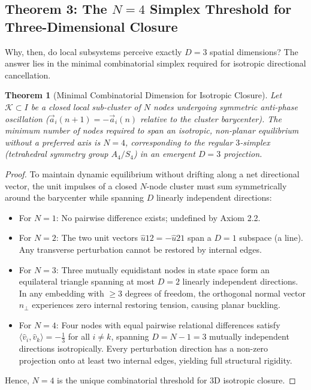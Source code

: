 \documentclass[11pt,a4paper]{article}
\theoremstyle{plain}
\newtheorem{theorem}{Theorem}[section]
\theoremstyle{definition}
\theoremstyle{remark}
\begin{document}
\subsection{Theorem 3: The $N=4$ Simplex Threshold for Three-Dimensional Closure}
Why, then, do local subsystems perceive exactly $D = 3$ spatial dimensions? The answer lies in the minimal combinatorial simplex required for isotropic directional cancellation.
\begin{theorem}[Minimal Combinatorial Dimension for Isotropic Closure]
\label{thm:simplex_3d}
Let $\mathcal{K} \subset I$ be a closed local sub-cluster of $N$ nodes undergoing symmetric anti-phase oscillation ($\vec{a}_i(n+1) = -\vec{a}_i(n)$ relative to the cluster barycenter). The minimum number of nodes required to span an isotropic, non-planar equilibrium without a preferred axis is $N = 4$, corresponding to the regular $3$-simplex (tetrahedral symmetry group $A_4 / S_4$) in an emergent $D = 3$ projection.
\end{theorem}
\begin{proof}
To maintain dynamic equilibrium without drifting along a net directional vector, the unit impulses of a closed $N$-node cluster must sum symmetrically around the barycenter while spanning $D$ linearly independent directions:
\begin{itemize}
\item For $N = 1$: No pairwise difference exists; undefined by Axiom 2.2.
\item For $N = 2$: The two unit vectors $\hat{u}{12} = -\hat{u}{21}$ span a $D = 1$ subspace (a line). Any transverse perturbation cannot be restored by internal edges.
\item For $N = 3$: Three mutually equidistant nodes in state space form an equilateral triangle spanning at most $D = 2$ linearly independent directions. In any embedding with $\ge 3$ degrees of freedom, the orthogonal normal vector $\hat{n}_\perp$ experiences zero internal restoring tension, causing planar buckling.
\item For $N = 4$: Four nodes with equal pairwise relational differences satisfy $\langle \hat{v}_i, \hat{v}_k \rangle = -\frac{1}{3}$ for all $i \neq k$, spanning $D = N - 1 = 3$ mutually independent directions isotropically. Every perturbation direction has a non-zero projection onto at least two internal edges, yielding full structural rigidity.
\end{itemize}
Hence, $N = 4$ is the unique combinatorial threshold for 3D isotropic closure.
\end{proof}
\end{document}
